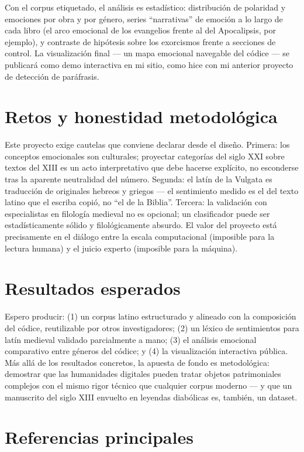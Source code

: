 \documentclass[11pt]{article}
\begin{document}
Con el corpus etiquetado, el análisis es estadístico: distribución de polaridad y emociones
por obra y por género, series ``narrativas'' de emoción a lo largo de cada libro (el arco
emocional de los evangelios frente al del Apocalipsis, por ejemplo), y contraste de
hipótesis sobre los exorcismos frente a secciones de control. La visualización final ---
un mapa emocional navegable del códice --- se publicará como demo interactiva en mi sitio,
como hice con mi anterior proyecto de detección de paráfrasis.

\section{Retos y honestidad metodológica}

Este proyecto exige cautelas que conviene declarar desde el diseño. Primera: los conceptos
emocionales son culturales; proyectar categorías del siglo XXI sobre textos del XIII es un
acto interpretativo que debe hacerse explícito, no esconderse tras la aparente neutralidad
del número. Segunda: el latín de la Vulgata es traducción de originales hebreos y griegos
--- el sentimiento medido es el del texto latino que el escriba copió, no ``el de la
Biblia''. Tercera: la validación con especialistas en filología medieval no es opcional;
un clasificador puede ser estadísticamente sólido y filológicamente absurdo. El valor del
proyecto está precisamente en el diálogo entre la escala computacional (imposible para la
lectura humana) y el juicio experto (imposible para la máquina).

\section{Resultados esperados}

Espero producir: (1) un corpus latino estructurado y alineado con la composición del códice,
reutilizable por otros investigadores; (2) un léxico de sentimientos para latín medieval
validado parcialmente a mano; (3) el análisis emocional comparativo entre géneros del códice;
y (4) la visualización interactiva pública. Más allá de los resultados concretos, la apuesta
de fondo es metodológica: demostrar que las humanidades digitales pueden tratar objetos
patrimoniales complejos con el mismo rigor técnico que cualquier corpus moderno --- y que un
manuscrito del siglo XIII envuelto en leyendas diabólicas es, también, un dataset.

\section*{Referencias principales}
\end{document}
